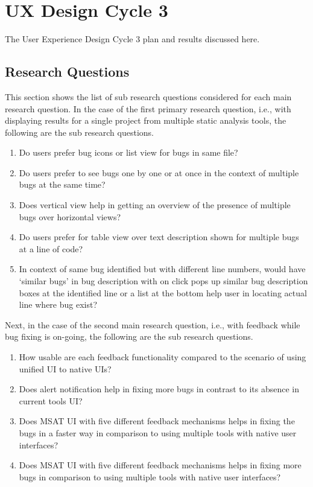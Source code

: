 \chapter{UX Design Cycle 3}
\label{ch:ux3-cycle_report}

The User Experience Design Cycle 3 plan and results discussed here. \\

\section{Research Questions}

This section shows the list of sub research questions considered for each main research question. In the case of the first primary research question, i.e., with displaying results for a single project from multiple static analysis tools, the following are the sub research questions. \\

\begin{enumerate}
\item Do users prefer bug icons or list view for bugs in same file?
\item Do users prefer to see bugs one by one or at once in the context of multiple bugs at the same time?
\item Does vertical view help in getting an overview of the presence of multiple bugs over horizontal views?
\item Do users prefer for table view over text description shown for multiple bugs at a line of code?
\item In context of same bug identified but with different line numbers, would have ‘similar bugs’ in bug description with on click pops up similar bug description boxes at the identified line or a list at the bottom help user in locating actual line where bug exist?
\end{enumerate}

Next, in the case of the second main research question, i.e., with feedback while bug fixing is on-going, the following are the sub research questions. \\

\begin{enumerate}
\item How usable are each feedback functionality compared to the scenario of using unified UI to native UIs?
\item Does alert notification help in fixing more bugs in contrast to its absence in current tools UI?
\item Does MSAT UI with five different feedback mechanisms helps in fixing the bugs in a faster way in comparison to using multiple tools with native user interfaces?
\item Does MSAT UI with five different feedback mechanisms helps in fixing more bugs in comparison to using multiple tools with native user interfaces?
\end{enumerate}

